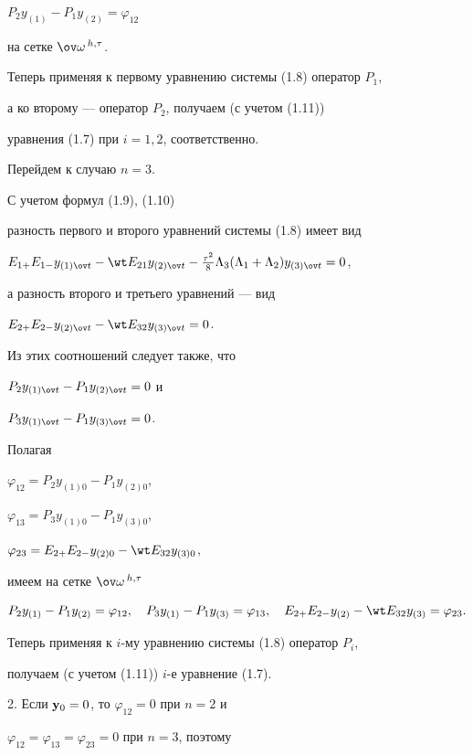 \begin{pf}
$P_2y_{(1)}-P_1y_{(2)}=\varphi_{12}$ 


на сетке $\ov\omega\,^{h,\tau}$.


Теперь применяя к первому уравнению системы (1.8) оператор $P_1$, 


а ко второму --- оператор $P_2$, получаем (с учетом (1.11)) 


уравнения (1.7) при $i=1,2$, соответственно.





Перейдем к случаю $n=3$.


С учетом формул (1.9), (1.10) 


разность первого и второго уравнений системы (1.8) имеет вид


$E_{1+}E_{1-}y_{(1)\ov t}-\wt E_{21}y_{(2)\ov t}-


\frac{\tau^2}{8}\Lambda_3(\Lambda_1+\Lambda_2)y_{(3)\ov t}=0$,


а разность второго и третьего уравнений --- вид


$E_{2+}E_{2-}y_{(2)\ov t}-\wt E_{32}y_{(3)\ov t}=0$.


Из этих соотношений следует также, что


$P_2y_{(1)\ov t}-P_1y_{(2)\ov t}=0$ и


$P_3y_{(1)\ov t}-P_1y_{(3)\ov t}=0$.


Полагая 


$\varphi_{12}=P_2y_{(1)0}-P_1y_{(2)0}$,


$\varphi_{13}=P_3y_{(1)0}-P_1y_{(3)0}$,


$\varphi_{23}=E_{2+}E_{2-}y_{(2)0}-\wt E_{32}y_{(3)0}$, 


имеем на сетке $\ov\omega\,^{h,\tau}$


$$


P_2y_{(1)}-P_1y_{(2)}=\varphi_{12},\quad


P_3y_{(1)}-P_1y_{(3)}=\varphi_{13},\quad


E_{2+}E_{2-}y_{(2)}-\wt E_{32}y_{(3)}=\varphi_{23}.


$$


Теперь применяя к $i$-му уравнению системы (1.8) оператор $P_i$, 


получаем (с учетом (1.11)) $i$-е уравнение (1.7).





2. Если ${\bold y}_0=0$, то $\varphi_{12}=0$ при $n=2$ и 


$\varphi_{12}=\varphi_{13}=\varphi_{23}=0$ при $n=3$, поэтому 



\end{pf}
